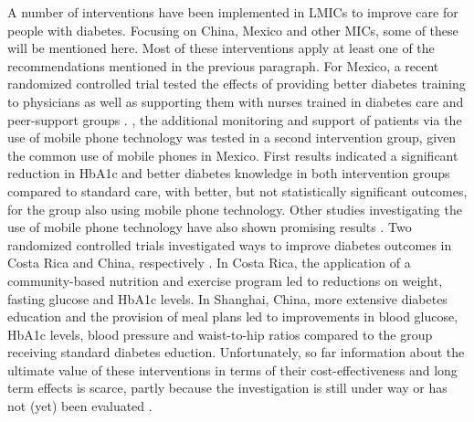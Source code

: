 A number of \DIFdelbegin {}\DIFdelend interventions have been implemented in \acp{LMIC} to improve care for people with diabetes\DIFdelbegin {}\DIFdelend . Focusing on China, Mexico and other \acp{MIC}, some of these will be mentioned here. Most of these interventions apply at least one of the recommendations mentioned in the previous paragraph. For Mexico, a recent randomized controlled trial tested the effects of providing better diabetes training to physicians as well as supporting them with nurses trained in diabetes care and peer-support groups \parencite{Contreras2016}. \DIFdelbegin {}\DIFdelend \DIFaddbegin {}\DIFaddend , the additional monitoring and support of patients via the use of mobile phone technology was tested in a second intervention group, given the common use of mobile phones in Mexico. First results indicated a significant reduction in \ac{HbA1c} and better diabetes knowledge in both intervention groups compared to standard care, with better, but not statistically significant outcomes, for the group also using mobile phone technology. Other studies investigating the use of mobile phone technology have also shown promising results \parencite{Singh2016}. Two randomized controlled trials investigated ways to improve diabetes outcomes in Costa Rica and China, respectively \parencite{Goldhaber-Fiebert2003a,Sun2008}. In Costa Rica, the application of a community-based nutrition and exercise program led to reductions on weight, fasting glucose and \ac{HbA1c} levels. In Shanghai, China, more extensive diabetes education and the provision of meal plans led to improvements in blood glucose, \ac{HbA1c} levels, blood pressure and waist-to-hip ratios compared to the group receiving standard diabetes eduction.  Unfortunately, so far information about the ultimate value of these interventions in terms of their cost-effectiveness and long term effects is scarce, partly because the investigation is still under way \parencite{Contreras2016} or has not (yet) been evaluated \parencite{Singh2016}.

